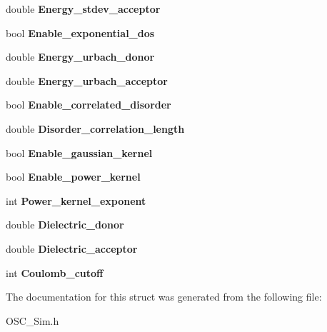 \begin{DoxyCompactItemize}
double {\bfseries Energy\+\_\+stdev\+\_\+acceptor}
\item 
\mbox{\label{struct_parameters___o_p_v_a9692bc03df03c19811fb493cc3fe29b4}} 
bool {\bfseries Enable\+\_\+exponential\+\_\+dos}
\item 
\mbox{\label{struct_parameters___o_p_v_ae8e499e0d565d7ac48fa7be42494af4f}} 
double {\bfseries Energy\+\_\+urbach\+\_\+donor}
\item 
\mbox{\label{struct_parameters___o_p_v_a5863aeb083dd3856ed971e0203530cb1}} 
double {\bfseries Energy\+\_\+urbach\+\_\+acceptor}
\item 
\mbox{\label{struct_parameters___o_p_v_a1087de977ebab3341104535fb7c43a88}} 
bool {\bfseries Enable\+\_\+correlated\+\_\+disorder}
\item 
\mbox{\label{struct_parameters___o_p_v_a9ffdced0457945542964e8af3f70007d}} 
double {\bfseries Disorder\+\_\+correlation\+\_\+length}
\item 
\mbox{\label{struct_parameters___o_p_v_a6388c89e616d7a9b46cb2b6434d78d64}} 
bool {\bfseries Enable\+\_\+gaussian\+\_\+kernel}
\item 
\mbox{\label{struct_parameters___o_p_v_a01b94b4373991c4fc0fd66a7bcdb1e20}} 
bool {\bfseries Enable\+\_\+power\+\_\+kernel}
\item 
\mbox{\label{struct_parameters___o_p_v_adbae25d923c165c2dbc0785c68fccf92}} 
int {\bfseries Power\+\_\+kernel\+\_\+exponent}
\item 
\mbox{\label{struct_parameters___o_p_v_a0c61716c4f210645b188a55d89645d04}} 
double {\bfseries Dielectric\+\_\+donor}
\item 
\mbox{\label{struct_parameters___o_p_v_a73a3db08abc5bc8b3b6e478cc4373769}} 
double {\bfseries Dielectric\+\_\+acceptor}
\item 
\mbox{\label{struct_parameters___o_p_v_ac5388c27ae33a5c648404cfce065a873}} 
int {\bfseries Coulomb\+\_\+cutoff}
\end{DoxyCompactItemize}


The documentation for this struct was generated from the following file\+:\begin{DoxyCompactItemize}
\item 
O\+S\+C\+\_\+\+Sim.\+h\end{DoxyCompactItemize}
